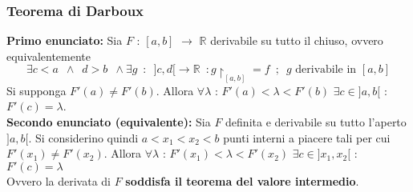 \documentclass[10pt]{article}
\theoremstyle{plain}
\begin{document}
\subsubsection{Teorema di Darboux}
\begin{ther}
    \textbf{Primo enunciato: }Sia $F$ : $[a,b]$ $\rightarrow$ $\mathbb{R}$ derivabile su tutto il chiuso, ovvero equivalentemente
    \[\exists c < a \enspace \land \enspace d > b \enspace \land \exists g \enspace : \enspace ]c,d[ \rightarrow \mathbb{R} \enspace : g \restriction_{[a,b]} = f \enspace ; \enspace g \textrm{ derivabile in } [a,b]\]
    Si supponga $F'(a) \neq F'(b)$. Allora $\forall \lambda$ : $F'(a) < \lambda < F'(b)$ $\exists c \in ]a, b[$ : $F'(c) = \lambda$.
    \\\textbf{Secondo enunciato (equivalente): } Sia $F$ definita e derivabile su tutto l'aperto $]a,b[$. Si considerino quindi $a<x_1 < x_2 < b$ punti interni a piacere tali per cui $F'(x_1) \neq F'(x_2)$. Allora $\forall \lambda$ : $F'(x_1) < \lambda < F'(x_2)$ $\exists c \in ]x_1, x_2[$ : $F'(c) = \lambda$
    \\Ovvero la derivata di $F$ \textbf{soddisfa il teorema del valore intermedio}.
\end{ther}
\end{document}
